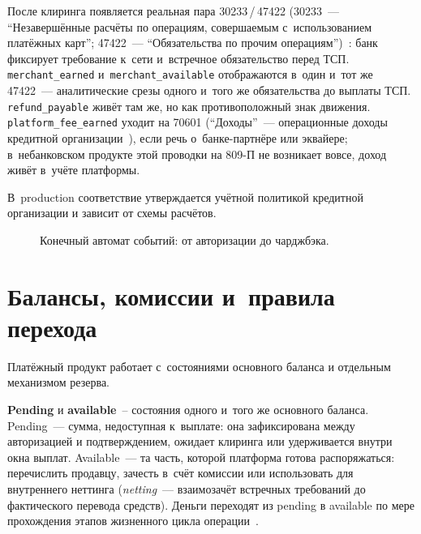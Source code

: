 После клиринга появляется реальная пара 30233\,/\,47422 (30233~---
\enquote{Незавершённые расчёты по операциям, совершаемым с~использованием
платёжных карт}; 47422~--- \enquote{Обязательства по прочим
операциям})~\cite{cbr-809p}: банк фиксирует требование к~сети
и~встречное обязательство перед ТСП. \texttt{merchant\_earned}
и~\texttt{merchant\_available} отображаются в~один и~тот же 47422~---
аналитические срезы одного и~того же обязательства до выплаты ТСП.
\texttt{refund\_payable} живёт там же, но как противоположный знак движения.
\texttt{platform\_fee\_earned} уходит на 70601 (\enquote{Доходы}~---
операционные доходы кредитной организации~\cite{cbr-809p}),
если речь о~банке-партнёре или эквайере; в~небанковском продукте этой
проводки на 809-П не возникает вовсе, доход живёт в~учёте платформы.

В~production соответствие утверждается учётной политикой кредитной
организации и зависит от схемы расчётов.

\begin{figure}[tbp]
  \centering
  \caption{Конечный автомат событий: от авторизации до чарджбэка.}\label{fig:event-state-machine}
\end{figure}

\section{Балансы, комиссии и~правила перехода}\label{sec:ledger-balances}

Платёжный продукт работает с~состояниями основного баланса
и отдельным механизмом резерва.

\textbf{Pending} и \textbf{available}~-- состояния одного и~того
же основного баланса. Pending~--- сумма, недоступная к~выплате:
она зафиксирована между авторизацией и подтверждением, ожидает клиринга
или удерживается внутри окна выплат. Available~--- та часть, которой
платформа готова распоряжаться: перечислить продавцу, зачесть
в~счёт комиссии или использовать для внутреннего неттинга
(\textit{netting}~--- взаимозачёт встречных требований до фактического
перевода средств). Деньги
переходят из pending в available по мере прохождения этапов
жизненного цикла операции~\cite{stripe-balances,adyen-balances}.

